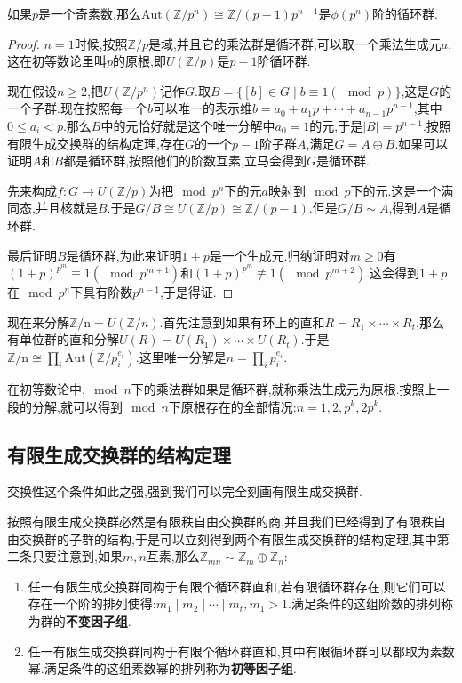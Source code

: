 如果$p$是一个奇素数,那么$\mathrm{Aut}(\mathbb{Z}/p^n)\cong \mathbb{Z}/(p-1)p^{n-1}$是$\phi(p^n)$阶的循环群.
\begin{proof}
	
	$n=1$时候,按照$\mathbb{Z}/p$是域,并且它的乘法群是循环群,可以取一个乘法生成元$a$,这在初等数论里叫$p$的原根,即$U(\mathbb{Z}/p)$是$p-1$阶循环群.
	
	现在假设$n\ge2$,把$U(\mathbb{Z}/p^n)$记作$G$.取$B=\{[b]\in G\mid b\equiv1(\mod p)\}$,这是$G$的一个子群.现在按照每一个$b$可以唯一的表示维$b=a_0+a_1p+\cdots+a_{n-1}p^{n-1}$,其中$0\le a_i<p$.那么$B$中的元恰好就是这个唯一分解中$a_0=1$的元,于是$|B|=p^{n-1}$.按照有限生成交换群的结构定理,存在$G$的一个$p-1$阶子群$A$,满足$G=A\oplus B$.如果可以证明$A$和$B$都是循环群,按照他们的阶数互素,立马会得到$G$是循环群.
	
	先来构成$f:G\to U(\mathbb{Z}/p)$为把$\mod p^n$下的元$a$映射到$\mod p$下的元.这是一个满同态,并且核就是$B$.于是$G/B\cong U(\mathbb{Z}/p)\cong \mathbb{Z}/(p-1)$.但是$G/B\sim A$,得到$A$是循环群.
	
	最后证明$B$是循环群,为此来证明$1+p$是一个生成元.归纳证明对$m\ge0$有$(1+p)^ {p^m}\equiv1(\mod p^{m+1})$和$(1+p)^{p^m}\not\equiv1(\mod p^{m+2})$.这会得到$1+p$在$\mod p^n$下具有阶数$p^{n-1}$,于是得证.
\end{proof}

现在来分解$\mathrm{\mathbb{Z}/n}=U(\mathbb{Z}/n)$.首先注意到如果有环上的直和$R=R_1\times\cdots\times R_t$,那么有单位群的直和分解$U(R)=U(R_1)\times\cdots\times U(R_t)$.于是$\mathrm{\mathbb{Z}/n}\cong\prod_i\mathrm{Aut}(\mathbb{Z}/p_i^{e_i})$.这里唯一分解是$n=\prod_ip_i^{e_i}$.

在初等数论中,$\mod n$下的乘法群如果是循环群,就称乘法生成元为原根.按照上一段的分解,就可以得到$\mod n$下原根存在的全部情况:$n=1,2,p^k,2p^k$.
\newpage
\subsection{有限生成交换群的结构定理}

交换性这个条件如此之强,强到我们可以完全刻画有限生成交换群.

按照有限生成交换群必然是有限秩自由交换群的商,并且我们已经得到了有限秩自由交换群的子群的结构,于是可以立刻得到两个有限生成交换群的结构定理,其中第二条只要注意到,如果$m,n$互素,那么$\mathbb{Z} _{mn}\sim\mathbb{Z}_m\oplus\mathbb{Z}_n$:
\begin{enumerate}
	\item 任一有限生成交换群同构于有限个循环群直和,若有限循环群存在,则它们可以存在一个阶的排列使得:$m_1\mid m_2\mid\cdots\mid m_t,m_1>1$.满足条件的这组阶数的排列称为群的\textbf{不变因子组}.
	\item 任一有限生成交换群同构于有限个循环群直和,其中有限循环群可以都取为素数幂.满足条件的这组素数幂的排列称为\textbf{初等因子组}.
\end{enumerate}

